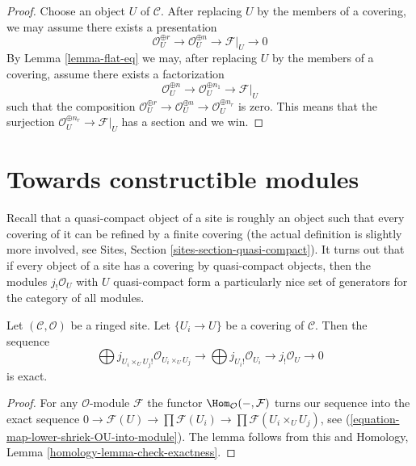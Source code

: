 \begin{proof}
Choose an object $U$ of $\mathcal{C}$.
After replacing $U$ by the members of a covering, we may
assume there exists a presentation
$$
\mathcal{O}_U^{\oplus r} \to
\mathcal{O}_U^{\oplus n} \to \mathcal{F}|_U \to 0
$$
By Lemma \ref{lemma-flat-eq} we may, after replacing $U$
by the members of a covering, assume there exists a factorization
$$
\mathcal{O}_U^{\oplus n} \to
\mathcal{O}_U^{\oplus n_1} \to \mathcal{F}|_U
$$
such that the composition
$\mathcal{O}_U^{\oplus r} \to \mathcal{O}_U^{\oplus n}
\to \mathcal{O}_U^{\oplus n_r}$ is zero.
This means that the surjection $\mathcal{O}_U^{\oplus n_r} \to \mathcal{F}|_U$
has a section and we win.
\end{proof}











\section{Towards constructible modules}
\label{section-constructible}

\noindent
Recall that a quasi-compact object of a site is roughly an object
such that every covering of it can be refined by a finite covering
(the actual definition is slightly more involved, see
Sites, Section \ref{sites-section-quasi-compact}). It turns out that
if every object of a site has a covering by quasi-compact objects, then
the modules $j_!\mathcal{O}_U$ with $U$ quasi-compact form a particularly
nice set of generators for the category of all modules.

\begin{lemma}
\label{lemma-covering-gives-surjection}
Let $(\mathcal{C}, \mathcal{O})$ be a ringed site. Let $\{U_i \to U\}$
be a covering of $\mathcal{C}$. Then the sequence
$$
\bigoplus j_{U_i \times_U U_j!}\mathcal{O}_{U_i \times_U U_j} \to
\bigoplus j_{U_i!}\mathcal{O}_{U_i} \to j_!\mathcal{O}_U \to 0
$$
is exact.
\end{lemma}

\begin{proof}
For any $\mathcal{O}$-module $\mathcal{F}$ the functor
$\Hom_\mathcal{O}(-, \mathcal{F})$ turns our sequence into the exact sequence
$0 \to \mathcal{F}(U) \to \prod \mathcal{F}(U_i) \to
\prod \mathcal{F}(U_i \times_U U_j)$, see
(\ref{equation-map-lower-shriek-OU-into-module}). The lemma follows from
this and
Homology, Lemma \ref{homology-lemma-check-exactness}.
\end{proof}

